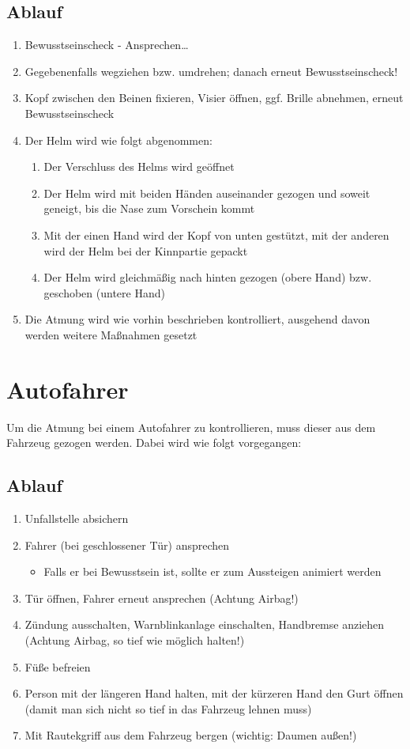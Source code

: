 \subsection*{Ablauf}
\begin{enumerate}
    \item Bewusstseinscheck - Ansprechen\dots
    \item Gegebenenfalls wegziehen bzw. umdrehen; danach erneut Bewusstseinscheck!
    \item Kopf zwischen den Beinen fixieren, Visier öffnen, ggf. Brille abnehmen, erneut Bewusstseinscheck
    \item Der Helm wird wie folgt abgenommen:
    \begin{enumerate}
        \item Der Verschluss des Helms wird geöffnet
        \item Der Helm wird mit beiden Händen auseinander gezogen und soweit geneigt, bis die Nase zum Vorschein kommt
        \item Mit der einen Hand wird der Kopf von unten gestützt, mit der anderen wird der Helm bei der Kinnpartie gepackt
        \item Der Helm wird gleichmäßig nach hinten gezogen (obere Hand) bzw. geschoben (untere Hand)
    \end{enumerate}
    \item Die Atmung wird wie vorhin beschrieben kontrolliert, ausgehend davon werden weitere Maßnahmen gesetzt
\end{enumerate}

\section{Autofahrer}
Um die Atmung bei einem Autofahrer zu kontrollieren, muss dieser aus dem Fahrzeug gezogen werden. Dabei wird wie folgt vorgegangen:
\subsection*{Ablauf}
\begin{enumerate}
    \item Unfallstelle absichern
    \item Fahrer (bei geschlossener Tür) ansprechen
    \begin{itemize}
        \item Falls er bei Bewusstsein ist, sollte er zum Aussteigen animiert werden
    \end{itemize}
    \item Tür öffnen, Fahrer erneut ansprechen (Achtung Airbag!)
    \item Zündung ausschalten, Warnblinkanlage einschalten, Handbremse anziehen (Achtung Airbag, so tief wie möglich halten!)
    \item Füße befreien
    \item Person mit der längeren Hand halten, mit der kürzeren Hand den Gurt öffnen (damit man sich nicht so tief in das Fahrzeug lehnen muss)
    \item Mit Rautekgriff aus dem Fahrzeug bergen (wichtig: Daumen außen!)
\end{enumerate}